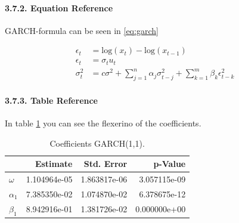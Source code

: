 \documentclass[
]{article}
\begin{document}
\newpage

\hypertarget{equation-reference}{%
\paragraph{3.7.2. Equation Reference}\label{equation-reference}}

GARCH-formula can be seen in \ref{eq:garch}

\begin{align} \label{eq:garch}
  \epsilon_{t} &= \mathrm{log}(x_{t})-\mathrm{log}(x_{t-1}) \nonumber \\
  \epsilon_{t} &= \sigma_{t}u_{t} \\
  \sigma_{t}^{2} &=c \sigma^{2}+\sum_{j=1}^{n}\alpha_{j}\sigma_{t-j}^{2}+\sum_{k=1}^{m}\beta_{k}\epsilon_{t-k}^{2} \nonumber
\end{align}

\newpage

\hypertarget{table-reference}{%
\paragraph{3.7.3. Table Reference}\label{table-reference}}

In table \ref{tab:coeftable} you can see the flexerino of the
coefficients.

\begin{table}

\caption{\label{tab:coeftable}Coefficients GARCH(1,1).}
\centering
\begin{tabular}[t]{lrrr}
\toprule
  & Estimate & Std. Error & p-Value\\
\midrule
$\omega$ & 1.104964e-05 & 1.863817e-06 & 3.057115e-09\\
$\alpha_{1}$ & 7.385350e-02 & 1.074870e-02 & 6.378675e-12\\
$\beta_{1}$ & 8.942916e-01 & 1.381726e-02 & 0.000000e+00\\
\bottomrule
\end{tabular}
\end{table}

\begin{quote}
\begin{quote}
\begin{quote}
\begin{quote}
\begin{quote}
\begin{quote}
\begin{quote}
\newpage
\end{quote}
\end{quote}
\end{quote}
\end{quote}
\end{quote}
\end{quote}
\end{quote}
\end{document}
